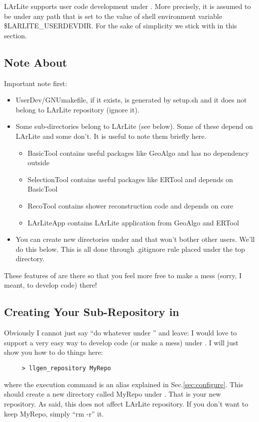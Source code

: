 
LArLite supports user code development under \UserDev.
More precisely, it is assumed to be under any path that is set to the value of shell environment variable {\ttfamily \$LARLITE\_USERDEVDIR}. 
For the sake of simplicity we stick with \UserDev in this section.

\subsection{Note About \UserDev}
Important note first:
\begin{itemize}
  \item {\ttfamily UserDev/GNUmakefile}, if it exists, is generated by setup.sh and it does not belong to LArLite repository (ignore it).
  \item Some sub-directories belong to LArLite (see below). Some of these depend on LArLite and some don't. It is useful to note them briefly here.
    \begin{itemize}
        \item {\ttfamily BasicTool} contains useful packages like {\ttfamily GeoAlgo} and has no dependency outside
        \item {\ttfamily SelectionTool} contains useful packages like {\ttfamily ERTool} and depends on {\ttfamily BasicTool}
        \item {\ttfamily RecoTool} contains shower reconstruction code and depends on {\ttfamily core}
        \item {\ttfamily LArLiteApp} contains LArLite application from {\ttfamily GeoAlgo} and {\ttfamily ERTool} 
    \end{itemize}
  \item You can create new directories under \UserDev and that won't bother other users. We'll do this below. 
  This is all done through {\ttfamily .gitignore} rule placed under the top directory. 
\end{itemize}

These features of \UserDev are there so that you feel more free to make a mess (sorry, I meant, to develop code) there!

\subsection{Creating Your Sub-Repository in \UserDev}
\label{sec:devrepo:makenew}
Obviously I cannot just say ``do whatever under \UserDev'' and leave: 
I would love to support a very easy way to develop code (or make a mess) under \UserDev. 
I will just show you how to do things here:
\begin{lstlisting}
     > llgen_repository MyRepo
\end{lstlisting}
where the execution command is an alias explained in Sec.\ref{sec:configure}.
This should create a new directory called {\ttfamily MyRepo} under \UserDev. 
That is your new repository. As said, this does not affect LArLite repository. 
If you don't want to keep {\ttfamily MyRepo}, simply ``{\ttfamily rm -r}'' it.


